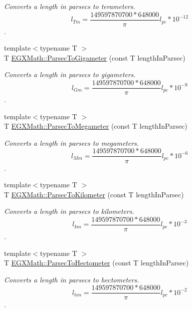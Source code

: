 \begin{DoxyCompactItemize}
\begin{DoxyCompactList}\small\item\em Converts a length in parsecs to terameters. \[ l_{Tm}=\frac{149597870700 * 648000}{\pi}l_{pc} * 10^{-12} \]. \end{DoxyCompactList}\item 
{\footnotesize template$<$typename T $>$ }\\T \mbox{\hyperlink{group___e_g_x_math-_conversions-_length_conversions-_astronomical-_parsec-_s_i_ga8b4677ca02eae3ff100d1cdca6ae2392}{E\+G\+X\+Math\+::\+Parsec\+To\+Gigameter}} (const T length\+In\+Parsec)
\begin{DoxyCompactList}\small\item\em Converts a length in parsecs to gigameters. \[ l_{Gm}=\frac{149597870700 * 648000}{\pi}l_{pc} * 10^{-9} \]. \end{DoxyCompactList}\item 
{\footnotesize template$<$typename T $>$ }\\T \mbox{\hyperlink{group___e_g_x_math-_conversions-_length_conversions-_astronomical-_parsec-_s_i_ga2b7c62d851d25cb2041e3bc339110790}{E\+G\+X\+Math\+::\+Parsec\+To\+Megameter}} (const T length\+In\+Parsec)
\begin{DoxyCompactList}\small\item\em Converts a length in parsecs to megameters. \[ l_{Mm}=\frac{149597870700 * 648000}{\pi}l_{pc} * 10^{-6} \]. \end{DoxyCompactList}\item 
{\footnotesize template$<$typename T $>$ }\\T \mbox{\hyperlink{group___e_g_x_math-_conversions-_length_conversions-_astronomical-_parsec-_s_i_gae7136d7d0b81221c5c71de565648fb93}{E\+G\+X\+Math\+::\+Parsec\+To\+Kilometer}} (const T length\+In\+Parsec)
\begin{DoxyCompactList}\small\item\em Converts a length in parsecs to kilometers. \[ l_{km}=\frac{149597870700 * 648000}{\pi}l_{pc} * 10^{-3} \]. \end{DoxyCompactList}\item 
{\footnotesize template$<$typename T $>$ }\\T \mbox{\hyperlink{group___e_g_x_math-_conversions-_length_conversions-_astronomical-_parsec-_s_i_ga8abf21ebe80987ba6668d54e90d46129}{E\+G\+X\+Math\+::\+Parsec\+To\+Hectometer}} (const T length\+In\+Parsec)
\begin{DoxyCompactList}\small\item\em Converts a length in parsecs to hectometers. \[ l_{hm}=\frac{149597870700 * 648000}{\pi}l_{pc} * 10^{-2} \]. \end{DoxyCompactList}\item 

\end{DoxyCompactItemize}
